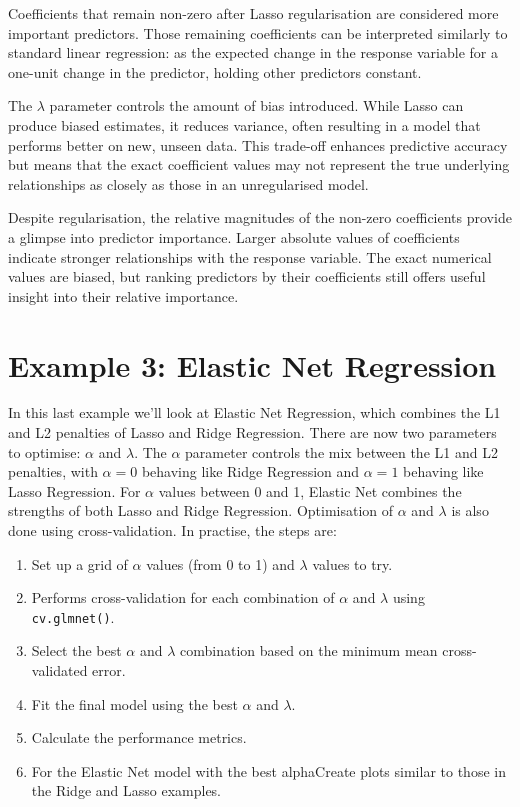 \documentclass[
  letterpaper,
]{book}
\providecommand{\tightlist}{%
  \setlength{\itemsep}{0pt}\setlength{\parskip}{0pt}}\usepackage{longtable,booktabs,array}
\begin{document}
Coefficients that remain non-zero after Lasso regularisation are
considered more important predictors. Those remaining coefficients can
be interpreted similarly to standard linear regression: as the expected
change in the response variable for a one-unit change in the predictor,
holding other predictors constant.

The \(\lambda\) parameter controls the amount of bias introduced. While
Lasso can produce biased estimates, it reduces variance, often resulting
in a model that performs better on new, unseen data. This trade-off
enhances predictive accuracy but means that the exact coefficient values
may not represent the true underlying relationships as closely as those
in an unregularised model.

Despite regularisation, the relative magnitudes of the non-zero
coefficients provide a glimpse into predictor importance. Larger
absolute values of coefficients indicate stronger relationships with the
response variable. The exact numerical values are biased, but ranking
predictors by their coefficients still offers useful insight into their
relative importance.

\section{Example 3: Elastic Net
Regression}\label{example-3-elastic-net-regression}

In this last example we'll look at Elastic Net Regression, which
combines the L1 and L2 penalties of Lasso and Ridge Regression. There
are now two parameters to optimise: \(\alpha\) and \(\lambda\). The
\(\alpha\) parameter controls the mix between the L1 and L2 penalties,
with \(\alpha = 0\) behaving like Ridge Regression and \(\alpha = 1\)
behaving like Lasso Regression. For \(\alpha\) values between 0 and 1,
Elastic Net combines the strengths of both Lasso and Ridge Regression.
Optimisation of \(\alpha\) and \(\lambda\) is also done using
cross-validation. In practise, the steps are:

\begin{enumerate}
\def\labelenumi{\arabic{enumi}.}
\tightlist
\item
  Set up a grid of \(\alpha\) values (from 0 to 1) and \(\lambda\)
  values to try.
\item
  Performs cross-validation for each combination of \(\alpha\) and
  \(\lambda\) using \texttt{cv.glmnet()}.
\item
  Select the best \(\alpha\) and \(\lambda\) combination based on the
  minimum mean cross-validated error.
\item
  Fit the final model using the best \(\alpha\) and \(\lambda\).
\item
  Calculate the performance metrics.
\item
  For the Elastic Net model with the best alphaCreate plots similar to
  those in the Ridge and Lasso examples.
\end{enumerate}
\end{document}
